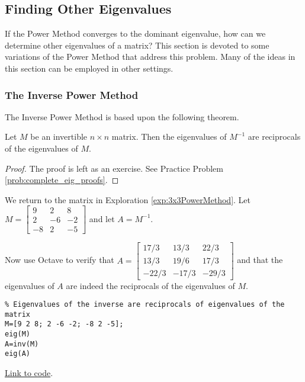 \documentclass{ximera}
\begin{document}
\subsection*{Finding Other Eigenvalues}

If the Power Method converges to the dominant eigenvalue, how can we determine other eigenvalues of a matrix?  This section is devoted to some variations of the Power Method that address this problem.  Many of the ideas in this section can be employed in other settings.

\subsubsection*{The Inverse Power Method}

The Inverse Power Method is based upon the following theorem.

\begin{theorem}\label{th:eig_inverse}
Let $M$ be an invertible $n \times n$ matrix.  Then the eigenvalues of $M^{-1}$ are reciprocals of the eigenvalues of $M$.
\end{theorem}

\begin{proof}
The proof is left as an exercise.  See Practice Problem \ref{prob:complete_eig_proofs}.
\end{proof}

We return to the matrix in Exploration \ref{exp:3x3PowerMethod}.  Let $M=\left[ \begin{array}{rrr}
9 & 2 & 8 \\
2 & -6 & -2 \\
-8 & 2 & -5
\end{array}\right]$ and let $A=M^{-1}$.  

Now use Octave to verify that $A=\left[ \begin{array}{rrr}
17/3 & 13/3 & 22/3 \\
13/3 & 19/6 & 17/3 \\
-22/3 & -17/3 & -29/3
\end{array}\right]$ and that the eigenvalues of $A$ are indeed the reciprocals of the eigenvalues of $M$.

\begin{verbatim}
% Eigenvalues of the inverse are reciprocals of eigenvalues of the matrix
M=[9 2 8; 2 -6 -2; -8 2 -5];
eig(M)
A=inv(M)
eig(A)
\end{verbatim}

\href{https://sagecell.sagemath.org/?z=eJxTVXDNTE_NK0vMKU0tVshPUyjJSFXIzCtLLSpOVUgsSlUoSk3OLCjKT07MAUunYqrOTSwpyqzg5fK1jbZUMFKwsAYSumYKukbWCroWILZprDUvF1Cjhq8mL5ejLdB0MAsk4qgJAPGVJtk=&lang=octave&interacts=eJyLjgUAARUAuQ==}{Link to code}.
\end{document}
